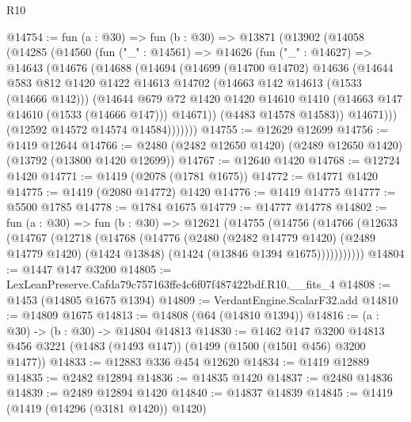 \begin{lexlean}{R10}
\begin{coremodule}
@14754 := fun (a : @30) =>
  fun (b : @30) =>
  @13871
    (@13902
      (@14058
        (@14285
          (@14560
            (fun ("_" : @14561) =>
            @14626
              (fun ("_" : @14627) =>
              @14643
                (@14676
                  (@14688
                    (@14694
                      (@14699
                        (@14700 @14702)
                        @14636
                        (@14644
                          @583
                          @812
                          @1420
                          @1422
                          @14613
                          @14702
                          (@14663 @142 @14613 (@1533 (@14666 @142)))
                          (@14644
                            @679
                            @72
                            @1420
                            @1420
                            @14610
                            @1410
                            (@14663 @147 @14610 (@1533 (@14666 @147)))
                            @14671))
                        (@4483 @14578 @14583))
                      @14671)))
                (@12592 @14572 @14574 @14584)))))))
@14755 := @12629 @12699
@14756 := @1419 @12644
@14766 := @2480 (@2482 @12650 @1420) (@2489 @12650 @1420) (@13792 (@13800 @1420 @12699))
@14767 := @12640 @1420
@14768 := @12724 @1420
@14771 := @1419 (@2078 (@1781 @1675))
@14772 := @14771 @1420
@14775 := @1419 (@2080 @14772) @1420
@14776 := @1419 @14775
@14777 := @5500 @1785
@14778 := @1784 @1675
@14779 := @14777 @14778
@14802 := fun (a : @30) =>
  fun (b : @30) =>
  @12621
    (@14755
      (@14756
        (@14766
          (@12633
            (@14767
              (@12718
                (@14768
                  (@14776
                    (@2480
                      (@2482 @14779 @1420)
                      (@2489 @14779 @1420)
                      (@1424 @13848)
                      (@1424 (@13846 @1394 @1675)))))))))))
@14804 := @1447 @147 @3200
@14805 := LexLeanPreserve.Cafda79c757163ffe4c6f07f487422bdf.R10.__fits_4
@14808 := @1453 (@14805 @1675 @1394)
@14809 := VerdantEngine.ScalarF32.add
@14810 := @14809 @1675
@14813 := @14808 (@64 (@14810 @1394))
@14816 := (a : @30) -> (b : @30) -> @14804 @14813
@14830 := @1462
    @147
    @3200
    @14813
    @456
    @3221
    (@1483 (@1493 @147))
    (@1499 (@1500 (@1501 @456) @3200 @1477))
@14833 := @12883 @336 @454 @12620
@14834 := @1419 @12889
@14835 := @2482 @12894
@14836 := @14835 @1420
@14837 := @2480 @14836
@14839 := @2489 @12894 @1420
@14840 := @14837 @14839
@14845 := @1419 (@1419 (@14296 (@3181 @1420)) @1420)

\end{coremodule}
\end{lexlean}
